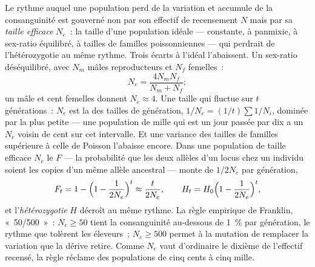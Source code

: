 \begin{theorem}\label{thm:b3:conservation-biology:ne}
Le rythme auquel une population perd de la variation et accumule de la
consanguinité est gouverné non par son effectif de recensement $N$ mais
par sa \emph{taille efficace} $N_{e}$~: la taille d'une population
idéale --- constante, à panmixie, à sex-ratio équilibré, à tailles de
familles poissonniennes --- qui perdrait de l'hétérozygotie au même
rythme. Trois écarts à l'idéal l'abaissent. Un sex-ratio déséquilibré,
avec $N_{m}$ mâles reproducteurs et $N_{f}$ femelles~:
\[
N_{e} = \frac{4N_{m}N_{f}}{N_{m} + N_{f}} ;
\]
un mâle et cent femelles donnent $N_{e} \approx 4$. Une taille qui
fluctue sur $t$ générations~: $N_{e}$ est la \emph{}
des tailles de génération, $1/N_{e} = (1/t)\sum 1/N_{i}$, dominée par la
plus petite --- une population de mille qui est un jour passée par dix a
un $N_{e}$ voisin de cent sur cet intervalle. Et une variance des
tailles de familles supérieure à celle de Poisson l'abaisse encore. Dans
une population de taille efficace $N_{e}$ le \emph{} $F$ --- la probabilité que les deux allèles d'un locus
chez un individu soient les copies d'un même allèle ancestral --- monte
de $1/2N_{e}$ par génération,
\[
F_{t} = 1 - \Bigl(1 - \frac{1}{2N_{e}}\Bigr)^{t} \approx \frac{t}{2N_{e}},
\qquad H_{t} = H_{0}\Bigl(1 - \frac{1}{2N_{e}}\Bigr)^{t} ,
\]
et l'\emph{hétérozygotie} $H$ décroît au même rythme. La règle empirique
de Franklin, «~50/500~»~: $N_{e} \ge 50$ tient la consanguinité
au-dessous de \qty{1}{\%} par génération, le rythme que tolèrent les
éleveurs~; $N_{e} \ge
500$ permet à la mutation de remplacer la variation que la dérive
retire. Comme $N_{e}$ vaut d'ordinaire le dixième de l'effectif
recensé, la règle réclame des populations de cinq cents à cinq mille.
\end{theorem}
